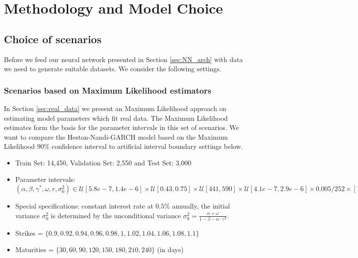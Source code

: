 \documentclass{article}
\begin{document}
\section{Methodology and Model Choice}
\subsection{Choice of scenarios}\label{sec:scenarios}
Before we feed our neural network presented in Section \ref{sec:NN_arch} with data we need to generate suitable datasets. We consider the following settings.

\subsubsection{Scenarios based on Maximum Likelihood estimators}\label{sec:setupmle}
In Section \ref{sec:real_data} we present an Maximum Likelihood approach on estimating model parameters which fit real data. The Maximum Likelihood estimates form the basis for the parameter intervals in this set of scenarios. We want to compare the Heston-Nandi-GARCH model based on the Maximum Likelihood $90\%$ confidence interval to artificial interval boundary settings below.
\begin{itemize}
    \item Train Set: 14,450, Validation Set: 2,550 and Test Set: 3,000
    \item Parameter intervals: $(\alpha, \beta, \gamma^*, \omega, r ,\sigma_0^2) \in \mathcal{U}[5.8e-7, 1.4e-6] \times \mathcal{U}[0.43, 0.75] \times \mathcal{U}[441, 590] \times \mathcal{U}[4.1e-7, 2.9e-6] \times 0.005/252 \times [1.3e-4, 0.001]$
    \item Special specifications: constant interest rate at $0.5\%$ annually, the initial variance $\sigma_0^2$ is determined by the unconditional variance  $\sigma_0^2 = \frac{\alpha+\omega}{1-\beta-\alpha\cdot\gamma^2}$.
    \item Strikes = $\{0.9, 0.92, 0.94, 0.96, 0.98, 1, 1.02, 1.04, 1.06, 1.08, 1.1\}$
    \item Maturities = $\{30, 60, 90, 120, 150, 180, 210, 240\}$ (in days)
\end{itemize}
    
\end{document}
